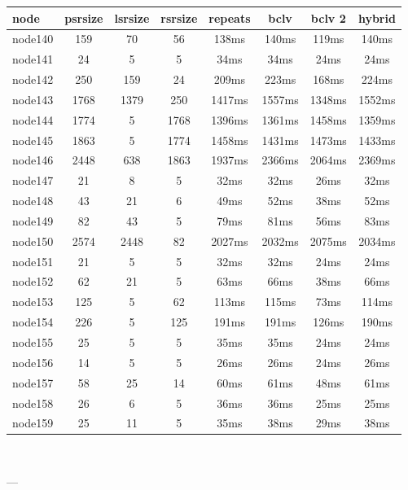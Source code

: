 \begin{tabular}{|l|c|c|c|c|c|c|c|}
\hline node & psrsize & lsrsize & rsrsize   & repeats & bclv & bclv 2 & hybrid\\
    \hline node140 & 159 & 70 & 56 & 138ms & 140ms & 119ms & 140ms\\
    \hline node141 & 24 & 5 & 5 & 34ms & 34ms & 24ms & 24ms\\
    \hline node142 & 250 & 159 & 24 & 209ms & 223ms & 168ms & 224ms\\
    \hline node143 & 1768 & 1379 & 250 & 1417ms & 1557ms & 1348ms & 1552ms\\
    \hline node144 & 1774 & 5 & 1768 & 1396ms & 1361ms & 1458ms & 1359ms\\
    \hline node145 & 1863 & 5 & 1774 & 1458ms & 1431ms & 1473ms & 1433ms\\
    \hline node146 & 2448 & 638 & 1863 & 1937ms & 2366ms & 2064ms & 2369ms\\
    \hline node147 & 21 & 8 & 5 & 32ms & 32ms & 26ms & 32ms\\
    \hline node148 & 43 & 21 & 6 & 49ms & 52ms & 38ms & 52ms\\
    \hline node149 & 82 & 43 & 5 & 79ms & 81ms & 56ms & 83ms\\
    \hline node150 & 2574 & 2448 & 82 & 2027ms & 2032ms & 2075ms & 2034ms\\
    \hline node151 & 21 & 5 & 5 & 32ms & 32ms & 24ms & 24ms\\
    \hline node152 & 62 & 21 & 5 & 63ms & 66ms & 38ms & 66ms\\
    \hline node153 & 125 & 5 & 62 & 113ms & 115ms & 73ms & 114ms\\
    \hline node154 & 226 & 5 & 125 & 191ms & 191ms & 126ms & 190ms\\
    \hline node155 & 25 & 5 & 5 & 35ms & 35ms & 24ms & 24ms\\
    \hline node156 & 14 & 5 & 5 & 26ms & 26ms & 24ms & 26ms\\
    \hline node157 & 58 & 25 & 14 & 60ms & 61ms & 48ms & 61ms\\
    \hline node158 & 26 & 6 & 5 & 36ms & 36ms & 25ms & 25ms\\
    \hline node159 & 25 & 11 & 5 & 35ms & 38ms & 29ms & 38ms\\

\hline
\end{tabular} \

---


